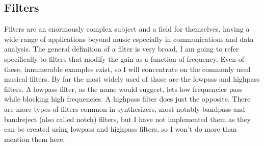 \documentclass[11pt,a4paper]{article}
\begin{document}
\subsection{Filters}

Filters are an enormously complex subject and a field for themselves, having a wide range of applications beyond music especially in communications and data analysis. The general definition of a filter is very broad, I am going to refer specifically to filters that modify the gain as a function of frequency.
Even of these, innumerable examples exist, so I will concentrate on the commonly used musical filters. By far the most widely used of those are the lowpass and highpass filters.
A lowpass filter, as the name would suggest, lets low frequencies pass while blocking high frequencies. A highpass filter does just the opposite.
There are more types of filters common in synthesizers, most notably bandpass and bandreject (also called notch) filters, but I have not implemented them as they can be created using lowpass and highpass filters, so I won't do more than mention them here.
\end{document}
